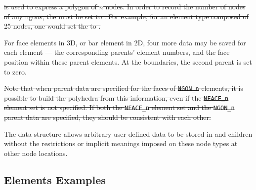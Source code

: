\sout{ is used to express a polygon of $n$ nodes.
In order to record the number of nodes of any ngons, the 
must be set to .
For example, for an element type  composed of 25
nodes, one would set the  to .}

For face elements in 3D, or bar element in 2D, four more data may be
saved for each element --- the corresponding parents' element numbers,
and the face position within these parent elements.
At the boundaries, the second parent is set to zero.

\begin{changes}\sout{Note that when parent data are specified for the faces of
\texttt{NGON\_n} elements, it is possible to build the polyhedra from
this information, even if the \texttt{NFACE\_n} element set is not
specified.
If both the \texttt{NFACE\_n} element set and the \texttt{NGON\_n} parent
data are specified, they should be consistent with each other.}\end{changes}

The  data structure allows arbitrary
user-defined data to be stored in  and
 children without the restrictions or implicit
meanings imposed on these node types at other node locations.

\subsection{Elements Examples}
\label{s:element_example}

